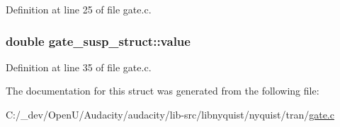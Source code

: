 Definition at line 25 of file gate.\+c.

\subsubsection[{\texorpdfstring{value}{value}}]{\setlength{\rightskip}{0pt plus 5cm}double gate\+\_\+susp\+\_\+struct\+::value}\hypertarget{structgate__susp__struct_a2136210761133f7b553d4eabcdc671cb}{}\label{structgate__susp__struct_a2136210761133f7b553d4eabcdc671cb}


Definition at line 35 of file gate.\+c.



The documentation for this struct was generated from the following file\+:\begin{DoxyCompactItemize}
\item 
C\+:/\+\_\+dev/\+Open\+U/\+Audacity/audacity/lib-\/src/libnyquist/nyquist/tran/\hyperlink{gate_8c}{gate.\+c}\end{DoxyCompactItemize}
